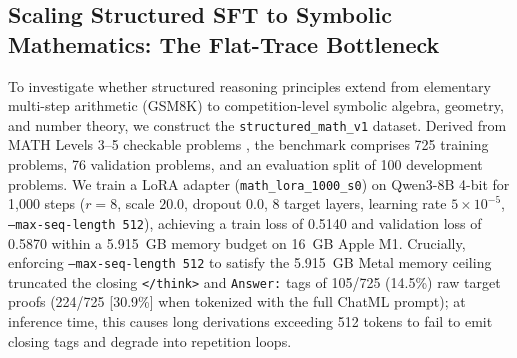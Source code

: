 \documentclass[11pt,a4paper]{article}
\begin{document}
\subsection{Scaling Structured SFT to Symbolic Mathematics: The Flat-Trace Bottleneck}
\label{sec:math_scaling}

To investigate whether structured reasoning principles extend from elementary multi-step arithmetic (GSM8K) to competition-level symbolic algebra, geometry, and number theory, we construct the \texttt{structured\_math\_v1} dataset. Derived from MATH Levels 3--5 checkable problems \citep{hendrycks2021measuring}, the benchmark comprises 725 training problems, 76 validation problems, and an evaluation split of 100 development problems. We train a LoRA adapter (\texttt{math\_lora\_1000\_s0}) on Qwen3-8B 4-bit for 1,000 steps ($r=8$, scale $20.0$, dropout $0.0$, 8 target layers, learning rate $5 \times 10^{-5}$, \texttt{--max-seq-length 512}), achieving a train loss of 0.5140 and validation loss of 0.5870 within a 5.915~GB memory budget on 16~GB Apple M1. Crucially, enforcing \texttt{--max-seq-length 512} to satisfy the 5.915~GB Metal memory ceiling truncated the closing \texttt{</think>} and \texttt{Answer:} tags of 105/725 (14.5\%) raw target proofs (224/725 [30.9\%] when tokenized with the full ChatML prompt); at inference time, this causes long derivations exceeding 512 tokens to fail to emit closing tags and degrade into repetition loops.

\begin{table}[t]
\centering
\scriptsize
{}
\caption{Empirical evaluation on MATH Levels 3--5 Dev-100 across inference and LoRA paradigms. Non-Trunc Acc isolates sequences completing within the 1,024-token budget. Rep Loops measures the fraction of truncated completions trapped in degenerate line or suffix repetition cycles ($\ge 5$ repetitions). Eligible evaluates pre-registered causal counterfactual feasibility (threshold: $\ge 30$).}
\label{tab:math_lora}
\end{table}
\end{document}
